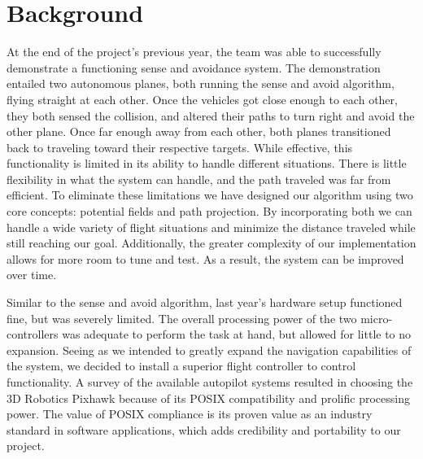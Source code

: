 \documentclass[12pt]{article}
\begin{document}
\section{Background}
At the end of the project's previous year, the team was able to successfully demonstrate a functioning sense and avoidance system. The demonstration entailed two autonomous planes, both running the sense and avoid algorithm, flying straight at each other. Once the vehicles got close enough to each other, they both sensed the collision, and altered their paths to turn right and avoid the other plane. Once far enough away from each other, both planes transitioned back to traveling toward their respective targets. While effective, this functionality is limited in its ability to handle different situations. There is little flexibility in what the system can handle, and the path traveled was far from efficient. To eliminate these limitations we have designed our algorithm using two core concepts: potential fields and path projection. By incorporating both we can handle a wide variety of flight situations and minimize the distance traveled while still reaching our goal. Additionally, the greater complexity of our implementation allows for more room to tune and test. As a result, the system can be improved over time.

Similar to the sense and avoid algorithm, last year's hardware setup functioned fine, but was severely limited. The overall processing power of the two micro-controllers was adequate to perform the task at hand, but allowed for little to no expansion. Seeing as we intended to greatly expand the navigation capabilities of the system, we decided to install a superior flight controller to control functionality. A survey of the available autopilot systems resulted in choosing the 3D Robotics Pixhawk because of its POSIX compatibility and prolific processing power. The value of POSIX compliance is its proven value as an industry standard in software applications, which adds credibility and portability to our project.

\end{document}
